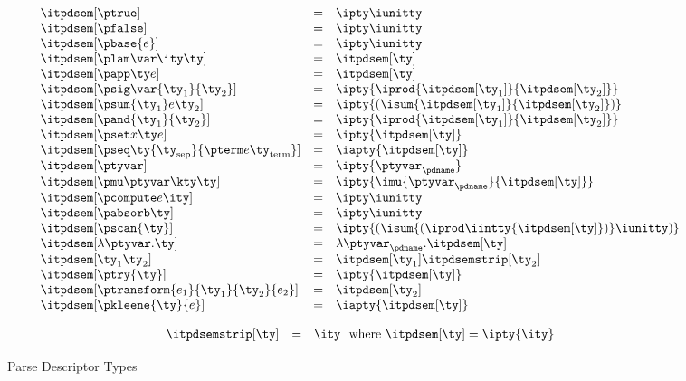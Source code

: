 \begin{figure}
\fbox{$\itpdsem[\ty] = \ity$}
\[ 
\begin{array}{lcl} 
\itpdsem[\ptrue] & = & \ipty \iunitty \\                                                  
\itpdsem[\pfalse] & = & \ipty \iunitty \\                                                  
\itpdsem[\pbase{e}] & = & \ipty \iunitty\\
\itpdsem[\plam \var \ity \ty] & = & \itpdsem[\ty] \\
\itpdsem[\papp \ty e] & = & \itpdsem[\ty] \\
\itpdsem[\psig \var {\ty_1} {\ty_2}] & = & 
               \ipty {\iprod {\itpdsem[\ty_1]} {\itpdsem[\ty_2]}} \\
\itpdsem[\psum {\ty_1} e {\ty_2}] & = & 
               \ipty {(\isum {\itpdsem[\ty_1]} {\itpdsem[\ty_2]})} \\
\itpdsem[\pand {\ty_1} {\ty_2}] & = & \ipty {\iprod {\itpdsem[\ty_1]} {\itpdsem[\ty_2]}}    \\
\itpdsem[\pset x \ty e] & = & \ipty {\itpdsem[\ty]} \\
\itpdsem[\pseq \ty {\ty_{\text{sep}}} {\pterm e {\ty_{\text{term}}}}] & = & 
  \iapty {\itpdsem[\ty]} \\
\itpdsem[\ptyvar] & = & \ipty{\ptyvar_\pdname} \\
\itpdsem[\pmu \ptyvar \kty \ty] & = & 
  \ipty{\imu{\ptyvar_\pdname}{\itpdsem[\ty]}} \\
\itpdsem[\pcompute e \ity]            & = & \ipty \iunitty \\
\itpdsem[\pabsorb \ty]                & = & \ipty \iunitty \\
\itpdsem[\pscan{\ty}] & = & \ipty {(\isum {(\iprod \iintty
    {\itpdsem[\ty]})} \iunitty)} \\
\itpdsem[\lambda \ptyvar.\ty]      
     & = & \lambda \ptyvar_\pdname.\itpdsem[\ty] \\
\itpdsem[\ty_1 \ty_2]            & = & \itpdsem[\ty_1] \itpdsemstrip[\ty_2] \\
\itpdsem[\ptry{\ty}]    & = & \ipty{\itpdsem[\ty]} \\
\itpdsem[\ptransform{e_1}{\ty_1}{\ty_2}{e_2}] & = & \itpdsem[\ty_2]\\
\itpdsem[\pkleene{\ty}{e}] & = & \iapty {\itpdsem[\ty]}
\end{array}
\]

\fbox{$\itpdsemstrip[\ty] = \ity$}

\[
\begin{array}{lcl} 
\itpdsemstrip[\ty] & = & \ity \ \ \mbox{where}\ \itpdsem[\ty] = \ipty{\ity}
\end{array}
\]
\caption{Parse Descriptor Types}
\label{fig:pd-tys}
\end{figure}

